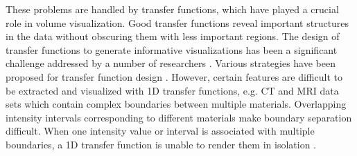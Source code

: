These problems are handled by transfer functions, which have played a crucial role in volume visualization.
Good transfer functions reveal important structures in the data without obscuring them with less important regions.
The design of transfer functions to generate informative visualizations has been a significant challenge addressed by a number of researchers \cite{pfister_transfer_2001}.
Various strategies have been proposed for transfer function design \cite{hadwiger_real-time_2006}.
However, certain features are difficult to be extracted and visualized with 1D transfer functions, e.g. CT and MRI data sets which contain complex boundaries between multiple materials.
Overlapping intensity intervals corresponding to different materials make boundary separation difficult.
When one intensity value or interval is associated with multiple boundaries, a 1D transfer function is unable to render them in isolation \cite{kniss_multidimensional_2002}.


